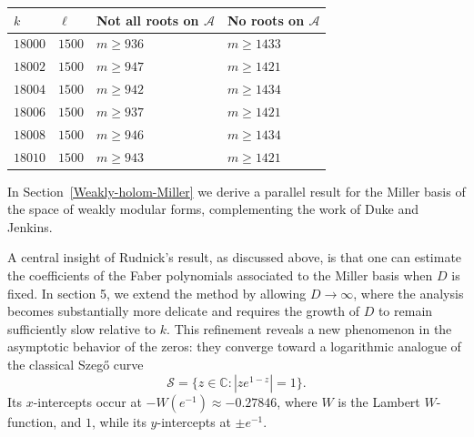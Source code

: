 \documentclass[12pt]{amsart}
\theoremstyle{plain} %
\theoremstyle{definition}
\theoremstyle{remark}
\numberwithin{equation}{section}
\begin{document}
\begin{center}
\begin{tabular}{llll}
$k$ & $\ell$ & Not all roots on $\mathcal{A}$ & No roots on
                                 $\mathcal{A}$\\
  \hline
$18000$ & $1500$ & $m\geq 936$ & $m\geq 1433$\\
$18002$ & $1500$ & $m\geq 947$ & $m\geq 1421$\\
$18004$ & $1500$ & $m\geq 942$ & $m\geq 1434$\\
$18006$ & $1500$ & $m\geq 937$ & $m\geq 1421$\\
$18008$ & $1500$ & $m\geq 946$ & $m\geq 1434$\\
$18010$ & $1500$ & $m\geq 943$ & $m\geq 1421$
\end{tabular}
\end{center}

In Section~\ref{Weakly-holom-Miller} we derive a parallel result for the Miller basis of the space of weakly modular forms, complementing the work of Duke and Jenkins. 


A central insight of Rudnick's result, as discussed above, is that one can estimate the coefficients of the Faber polynomials associated to the Miller basis when $D$ is fixed. In section 5, we extend the method by allowing $D\to \infty$,  where the analysis becomes substantially more delicate and requires the growth of $D$ to remain sufficiently slow relative to $k$. This refinement reveals a new phenomenon in the asymptotic behavior of the zeros: they converge toward a logarithmic analogue of the classical Szeg\H{o} curve \[ \mathcal{S}=\{z\in \mathbb{C}: |z e^{1-z}|=1\}.\]  Its $x$-intercepts occur at $-W(e^{-1})\approx -0.27846$, where $W$ is the Lambert $W$-function, and $1$, while its $y$-intercepts at $\pm e^{-1}$. 
\end{document}
